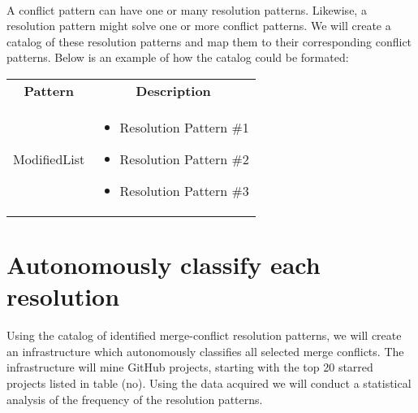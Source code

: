 \paragraph*{}
A conflict pattern can have one or many resolution patterns. Likewise, a resolution pattern might solve one or more conflict patterns. We will create a catalog of these resolution patterns and map them to their corresponding conflict patterns. Below is an example of how the catalog could be formated:\\
\begin{tabular}{ p{8cm} p{6cm} }
\hline
\multicolumn{1}{c}{\textbf{Pattern}} & \multicolumn{1}{c}{\textbf{Description}}\\
ModifiedList &
\begin{itemize}
\item Resolution Pattern \#1
\item Resolution Pattern \#2
\item Resolution Pattern \#3
\end{itemize}
\end{tabular}
\section{Autonomously classify each resolution}
Using the catalog of identified merge-conflict resolution patterns, we will create an infrastructure which autonomously classifies all selected merge conflicts. The infrastructure will mine GitHub projects, starting with the top 20 starred projects listed in table (no). Using the data acquired we will conduct a statistical analysis of the frequency of the resolution patterns.